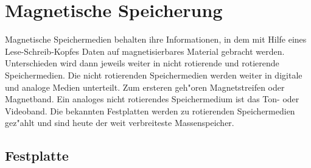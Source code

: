 				
			
			
			
    \section{Magnetische Speicherung}
    \label{ch:Technisch:sec:Magnetische Speicherung}
    
    Magnetische Speichermedien behalten ihre Informationen, in dem mit Hilfe eines Lese-Schreib-Kopfes Daten auf magnetisierbares Material gebracht werden. Unterschieden wird dann jeweils weiter in nicht rotierende und rotierende Speichermedien. Die nicht rotierenden Speichermedien werden weiter in digitale und analoge Medien unterteilt. Zum ersteren geh"oren Magnetstreifen oder Magnetband. Ein analoges nicht rotierendes Speichermedium ist das Ton- oder Videoband. Die bekannten Festplatten werden zu rotierenden Speichermedien gez"ahlt und sind heute der weit verbreiteste Massenspeicher.

        \subsection{Festplatte}
        \label{ch:Technisch:sec:Magnetische Speicherung:sub:Festplatte}
        
